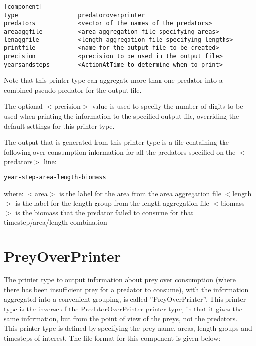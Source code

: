 \documentclass[10pt,twoside]{book}
\begin{document}
{\small\begin{verbatim}
[component]
type                 predatoroverprinter
predators            <vector of the names of the predators>
areaaggfile          <area aggregation file specifying areas>
lenaggfile           <length aggregation file specifying lengths>
printfile            <name for the output file to be created>
precision            <precision to be used in the output file>
yearsandsteps        <ActionAtTime to determine when to print>
\end{verbatim}}

Note that this printer type can aggregate more than one predator into a combined pseudo predator for the output file.

\bigskip
The optional $<$precision$>$ value is used to specify the number of digits to be used when printing the information to the specified output file, overriding the default settings for this printer type.

\bigskip
The output that is generated from this printer type is a file containing the following over-consumption information for all the predators specified on the $<$predators$>$ line:

{\small\begin{verbatim}
year-step-area-length-biomass
\end{verbatim}}

where:\newline
$<$area$>$ is the label for the area from the area aggregation file\newline
$<$length$>$ is the label for the length group from the length aggregation file\newline
$<$biomass$>$ is the biomass that the predator failed to consume for that timestep/area/length combination

\section{PreyOverPrinter}\label{sec:preyoverprinter}
The printer type to output information about prey over consumption (where there has been insufficient prey for a predator to consume), with the information aggregated into a convenient grouping, is called ''PreyOverPrinter''.  This printer type is the inverse of the PredatorOverPrinter printer type, in that it gives the same information, but from the point of view of the preys, not the predators.  This printer type is defined by specifying the prey name, areas, length groups and timesteps of interest.  The file format for this component is given below:
\end{document}
